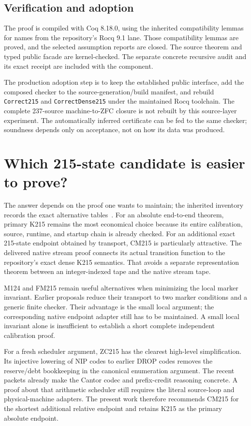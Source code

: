 \documentclass[11pt,letterpaper]{article}
\newcommand{\code}[1]{\texttt{#1}}
\begin{document}
\subsection{Verification and adoption}
The proof is compiled with Coq 8.18.0, using the inherited compatibility lemmas for names from the repository's Rocq 9.1 lane. Those compatibility lemmas are proved, and the selected assumption reports are closed. The source theorem and typed public facade are kernel-checked. The separate concrete recursive audit and its exact receipt are included with the component.

The production adoption step is to keep the established public interface, add the composed checker to the source-generation/build manifest, and rebuild \code{Correct215} and \code{CorrectDense215} under the maintained Rocq toolchain. The complete 237-source machine-to-ZFC closure is not rebuilt by this source-layer experiment. The automatically inferred certificate can be fed to the same checker; soundness depends only on acceptance, not on how its data was produced.





\section{Which 215-state candidate is easier to prove?}
The answer depends on the proof one wants to maintain; the inherited inventory records the exact alternative tables~\cite{alternatives}. For an absolute end-to-end theorem, primary K215 remains the most economical choice because its entire calibration, source, runtime, and startup chain is already checked. For an additional exact 215-state endpoint obtained by transport, CM215 is particularly attractive. The delivered native stream proof connects its actual transition function to the repository's exact dense K215 semantics. That avoids a separate representation theorem between an integer-indexed tape and the native stream tape.

M124 and FM215 remain useful alternatives when minimizing the local marker invariant. Earlier proposals reduce their transport to two marker conditions and a generic finite checker. Their advantage is the small local argument; the corresponding native endpoint adapter still has to be maintained. A small local invariant alone is insufficient to establish a short complete independent calibration proof.

For a fresh scheduler argument, ZC215 has the clearest high-level simplification. Its injective lowering of NIP codes to earlier DROP codes removes the reserve/debt bookkeeping in the canonical enumeration argument. The recent packets already make the Cantor codec and prefix-credit reasoning concrete. A proof about that arithmetic scheduler still requires the literal source-loop and physical-machine adapters. The present work therefore recommends CM215 for the shortest additional relative endpoint and retains K215 as the primary absolute endpoint.
\end{document}
